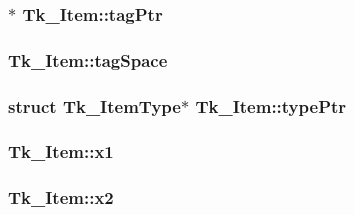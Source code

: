 \subsubsection[{\texorpdfstring{tag\+Ptr}{tagPtr}}]{$\ast$ Tk\+\_\+\+Item\+::tag\+Ptr}\hypertarget{struct_tk___item_a28c591367d6cc332e0be57ebc04af75e}{}\label{struct_tk___item_a28c591367d6cc332e0be57ebc04af75e}
\subsubsection[{\texorpdfstring{tag\+Space}{tagSpace}}]{ Tk\+\_\+\+Item\+::tag\+Space}\hypertarget{struct_tk___item_a33559e8870c9e3f4623119185c54a8da}{}\label{struct_tk___item_a33559e8870c9e3f4623119185c54a8da}
\subsubsection[{\texorpdfstring{type\+Ptr}{typePtr}}]{\setlength{\rightskip}{0pt plus 5cm}struct {\bf Tk\+\_\+\+Item\+Type}$\ast$ Tk\+\_\+\+Item\+::type\+Ptr}\hypertarget{struct_tk___item_a2b274e7dd5f04d40a45bf43cb8d5abae}{}\label{struct_tk___item_a2b274e7dd5f04d40a45bf43cb8d5abae}
\subsubsection[{\texorpdfstring{x1}{x1}}]{ Tk\+\_\+\+Item\+::x1}\hypertarget{struct_tk___item_a0fb4908b6598afb490737ae7149d4cd8}{}\label{struct_tk___item_a0fb4908b6598afb490737ae7149d4cd8}
\subsubsection[{\texorpdfstring{x2}{x2}}]{ Tk\+\_\+\+Item\+::x2}\hypertarget{struct_tk___item_a92ad5cc59f538b798b89d2e9b06e73ce}{}\label{struct_tk___item_a92ad5cc59f538b798b89d2e9b06e73ce}
